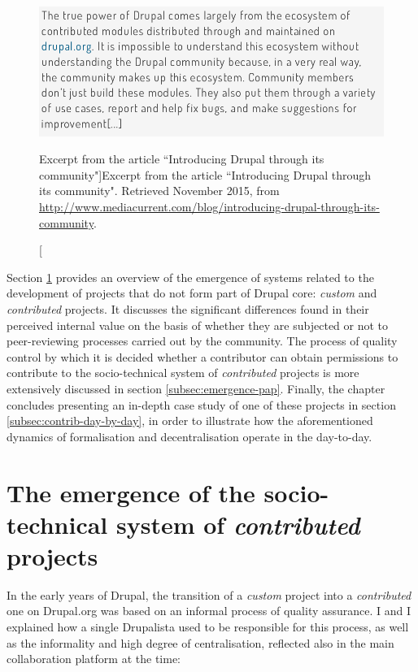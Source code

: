 \begin{figure}[H]
  \centering
\includegraphics[scale=0.45]{img/quotes_replacement/contrib_ecosystem.png}
\caption[Excerpt from the article ``Introducing Drupal through its community"]{Excerpt from the article ``Introducing Drupal through its community". Retrieved  November 2015, from \url{http://www.mediacurrent.com/blog/introducing-drupal-through-its-community}.}
\label{quote_contrib_ecosystem}
\end{figure}

Section \ref{subsec:emergence-contrib} provides an overview of the emergence of systems related to the development of projects that do not form part of Drupal core: \textit{custom} and \textit{contributed} projects. It discusses the significant differences found in their perceived internal value on the basis of whether they are subjected or not to peer-reviewing processes carried out by the community. The process of quality control by which it is decided whether a contributor can obtain permissions to contribute to the socio-technical system of \textit{contributed} projects is more extensively discussed in section \ref{subsec:emergence-pap}. Finally, the chapter concludes presenting an in-depth case study of one of these projects in section \ref{subsec:contrib-day-by-day}, in order to illustrate how the aforementioned dynamics of formalisation and decentralisation operate in the day-to-day.

\section{The emergence of the socio-technical system of \textit{contributed} projects}
\label{subsec:emergence-contrib}

In the early years of Drupal, the transition of a \textit{custom} project into a \textit{contributed} one on Drupal.org was based on an informal process of quality assurance. I and I explained how a single Drupalista used to be responsible for this process, as well as the informality and high degree of centralisation, reflected also in the main collaboration platform at the time:

